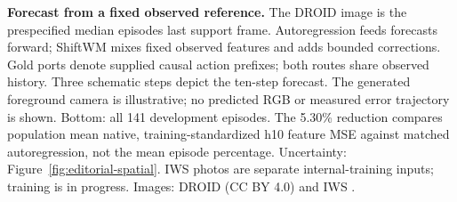 \textbf{Forecast from a fixed observed reference.} The DROID image is the prespecified median episode\textquotesingle s last support frame. Autoregression feeds forecasts forward; ShiftWM mixes fixed observed features and adds bounded corrections. Gold ports denote supplied causal action prefixes; both routes share observed history. Three schematic steps depict the ten-step forecast. The generated foreground camera is illustrative; no predicted RGB or measured error trajectory is shown. Bottom: all 141 development episodes. The 5.30\% reduction compares population mean native, training-standardized h10 feature MSE against matched autoregression, not the mean episode percentage. Uncertainty: Figure~\ref{fig:editorial-spatial}. IWS photos are separate internal-training inputs; training is in progress. Images: DROID (CC BY 4.0) and IWS \citep{zhang2026rlawm}.
